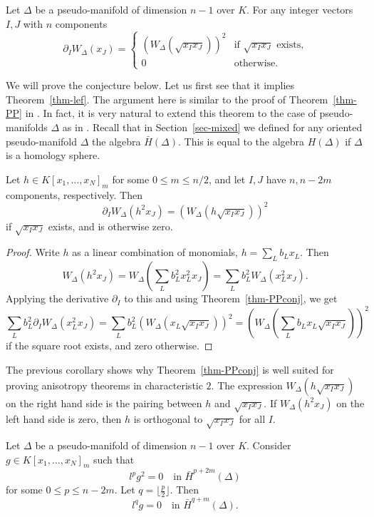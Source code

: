\begin{theorem} \label{thm-PPconj}
Let $\Delta$ be a  pseudo-manifold of dimension $n-1$ over $K$. For any integer vectors $I, J$ with $n$ components
\[ \partial_I W_\Delta(x_J) = \begin{cases} 
(W_\Delta (\sqrt{x_I x_J}))^2 & \text{if $\sqrt{x_I x_J}$ exists,} \\
0 & \text{otherwise.}
\end{cases}
\]
\end{theorem}

We will prove the conjecture below. Let us first see that it implies Theorem~\ref{thm-lef}. The argument here is similar to the proof of Theorem~\ref{thm-PP} in \cite{PapadakisPetrotou}. In fact, it is very natural to extend this theorem to the case of pseudo-manifolds $\Delta$ as in \cite{APP}. Recall that in Section~\ref{sec-mixed} we defined for any oriented pseudo-manifold $\Delta$ the algebra $\bar{H}(\Delta)$. This is equal to the algebra $H(\Delta)$ if $\Delta$ is a homology sphere.

\begin{coro} \label{cor-PPconj}
Let $h \in K[x_1,\ldots, x_N]_m$ for  some $0 \leq m \leq n/2$, and let $I, J$ have $n, n - 2m$ components, respectively. Then
\[ \partial_I W_\Delta(h^2 x_J) = (W_\Delta(h \sqrt{x_I x_J}))^2 \]
if $\sqrt{x_I x_J}$ exists, and is otherwise zero.
\end{coro}

\begin{proof}
Write $h$ as a linear combination of monomials, $h=\sum_L b_L x_L$. Then
\[ W_\Delta(h^2 x_J) = W_\Delta ( \sum_L b_L^2 x_L^2 x_J) = \sum_L b_L^2 W_\Delta (x_L^2 x_J).\]
Applying the derivative $\partial_I$ to this and using  Theorem~\ref{thm-PPconj}, we get
\[  \sum_L b_L^2 \partial_I W_\Delta (x_L^2 x_J) = \sum_L b_L^2 (W_\Delta (x_L \sqrt{x_I x_J}))^2 = (W_\Delta ( \sum_L b_L x_L \sqrt{x_I x_J}))^2\]
if the square root exists, and zero otherwise.
\end{proof}

The previous corollary shows why Theorem~\ref{thm-PPconj} is well suited for proving anisotropy theorems in characteristic $2$. The expression $W_\Delta(h \sqrt{x_I x_J})$ on the right hand side is the \Po pairing between $h$ and $\sqrt{x_I x_J}$. If $W_\Delta(h^2 x_J)$ on the left hand side is zero, then $h$ is orthogonal to $\sqrt{x_I x_J}$ for all $I$.

\begin{coro} \label{cor-reduce}
Let $\Delta$ be a pseudo-manifold of dimension $n-1$ over $K$. Consider $g\in K[x_1,\ldots, x_N]_m$ such that 
\[ l^p g^2 = 0 \quad \text{in $\bar{H}^{p+2m}(\Delta)$}\]
for some  $0\leq p \leq n-2m$. 
Let $q = \lfloor \frac{p}{2}\rfloor$. Then
\[ l^q g = 0 \quad \text{in $\bar{H}^{q+m}(\Delta)$.}\]
\end{coro}

